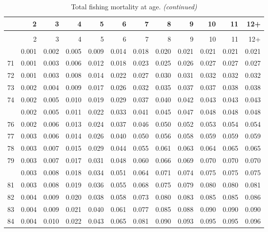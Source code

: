 \documentclass[
]{article}
\begin{document}
\begin{longtable}[t]{lrrrrrrrrrrr}
\caption{\label{tab:FAA-tot-table}Total fishing mortality at age.}\\
\toprule
  & 2 & 3 & 4 & 5 & 6 & 7 & 8 & 9 & 10 & 11 & 12+\\
\midrule
\endfirsthead
\caption[]{Total fishing mortality at age. \textit{(continued)}}\\
\toprule
  & 2 & 3 & 4 & 5 & 6 & 7 & 8 & 9 & 10 & 11 & 12+\\
\midrule
\endhead

\endfoot
\bottomrule
\endlastfoot
70 & 0.001 & 0.002 & 0.005 & 0.009 & 0.014 & 0.018 & 0.020 & 0.021 & 0.021 & 0.021 & 0.021\\
71 & 0.001 & 0.003 & 0.006 & 0.012 & 0.018 & 0.023 & 0.025 & 0.026 & 0.027 & 0.027 & 0.027\\
72 & 0.001 & 0.003 & 0.008 & 0.014 & 0.022 & 0.027 & 0.030 & 0.031 & 0.032 & 0.032 & 0.032\\
73 & 0.002 & 0.004 & 0.009 & 0.017 & 0.026 & 0.032 & 0.035 & 0.037 & 0.037 & 0.038 & 0.038\\
74 & 0.002 & 0.005 & 0.010 & 0.019 & 0.029 & 0.037 & 0.040 & 0.042 & 0.043 & 0.043 & 0.043\\
\addlinespace
75 & 0.002 & 0.005 & 0.011 & 0.022 & 0.033 & 0.041 & 0.045 & 0.047 & 0.048 & 0.048 & 0.048\\
76 & 0.002 & 0.006 & 0.013 & 0.024 & 0.037 & 0.046 & 0.050 & 0.052 & 0.053 & 0.054 & 0.054\\
77 & 0.003 & 0.006 & 0.014 & 0.026 & 0.040 & 0.050 & 0.056 & 0.058 & 0.059 & 0.059 & 0.059\\
78 & 0.003 & 0.007 & 0.015 & 0.029 & 0.044 & 0.055 & 0.061 & 0.063 & 0.064 & 0.065 & 0.065\\
79 & 0.003 & 0.007 & 0.017 & 0.031 & 0.048 & 0.060 & 0.066 & 0.069 & 0.070 & 0.070 & 0.070\\
\addlinespace
80 & 0.003 & 0.008 & 0.018 & 0.034 & 0.051 & 0.064 & 0.071 & 0.074 & 0.075 & 0.075 & 0.075\\
81 & 0.003 & 0.008 & 0.019 & 0.036 & 0.055 & 0.068 & 0.075 & 0.079 & 0.080 & 0.080 & 0.081\\
82 & 0.004 & 0.009 & 0.020 & 0.038 & 0.058 & 0.073 & 0.080 & 0.083 & 0.085 & 0.085 & 0.086\\
83 & 0.004 & 0.009 & 0.021 & 0.040 & 0.061 & 0.077 & 0.085 & 0.088 & 0.090 & 0.090 & 0.090\\
84 & 0.004 & 0.010 & 0.022 & 0.043 & 0.065 & 0.081 & 0.090 & 0.093 & 0.095 & 0.095 & 0.096\\

\end{longtable}
\end{document}
